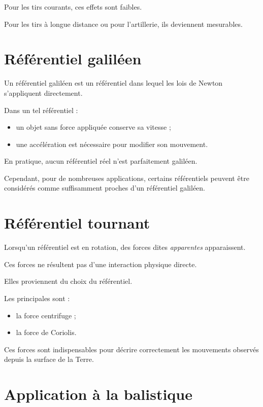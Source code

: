 Pour les tirs courants, ces effets sont faibles.

Pour les tirs à longue distance ou pour l'artillerie, ils deviennent
mesurables.

\section{Référentiel galiléen}

Un référentiel galiléen est un référentiel dans lequel les lois de Newton
s'appliquent directement.

Dans un tel référentiel :

\begin{itemize}
    \item un objet sans force appliquée conserve sa vitesse ;
    \item une accélération est nécessaire pour modifier son mouvement.
\end{itemize}

En pratique, aucun référentiel réel n'est parfaitement galiléen.

Cependant, pour de nombreuses applications, certains référentiels peuvent être
considérés comme suffisamment proches d'un référentiel galiléen.

\section{Référentiel tournant}

Lorsqu'un référentiel est en rotation, des forces dites \emph{apparentes}
apparaissent.

Ces forces ne résultent pas d'une interaction physique directe.

Elles proviennent du choix du référentiel.

Les principales sont :

\begin{itemize}
    \item la force centrifuge ;
    \item la force de Coriolis.
\end{itemize}

Ces forces sont indispensables pour décrire correctement les mouvements
observés depuis la surface de la Terre.

\section{Application à la balistique}

